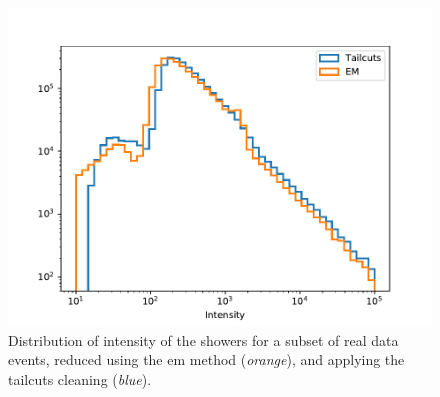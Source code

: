\documentclass[main.tex]{subfiles}
\begin{document}
\begin{figure}[h!]
  \centering
  \includegraphics[width=0.7\linewidth]{Pictures/compare_intensity_distribution.pdf}
  \caption{Distribution of intensity of the showers for a subset of real data events, reduced using the \gls{em} method (\textit{orange}), and applying the tailcuts cleaning (\textit{blue}).}
  \label{fig:intensitydistribution}
\end{figure}
\end{document}
